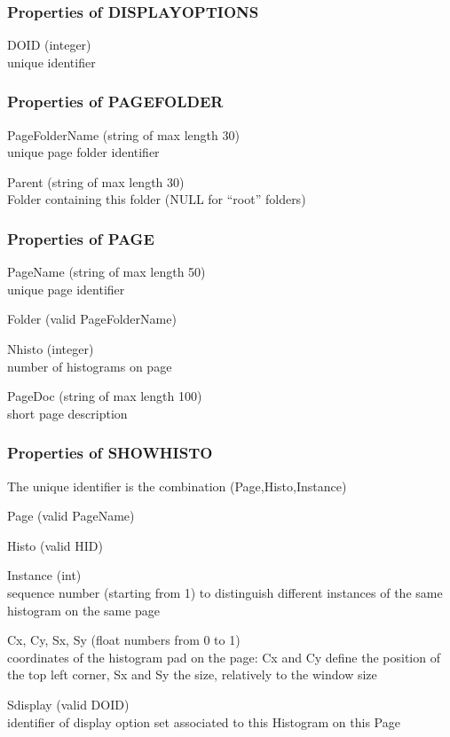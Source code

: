 \documentclass{lhcbnote}
\begin{document}
\subsubsection{Properties of DISPLAYOPTIONS}\label{dispopts}
\begin{description}
\item{DOID} (integer)\\
unique identifier 


\end{description}
\subsubsection{Properties of PAGEFOLDER}
\begin{description}
\item{PageFolderName} (string of max length 30)\\
unique page folder identifier
\item{Parent} (string of max length 30)\\
Folder containing this folder (NULL for ``root'' folders)
\end{description}

\subsubsection{Properties of PAGE}
\begin{description}
\item{PageName} (string of max length 50) \\
unique page identifier
\item{Folder} (valid PageFolderName) 
\item{Nhisto} (integer) \\
number of histograms on page
\item{PageDoc} (string of max length 100)\\
short page description
\end{description}

\subsubsection{Properties of SHOWHISTO}
The unique identifier is the combination (Page,Histo,Instance)
\begin{description}
\item{Page} (valid PageName)
\item{Histo} (valid HID)
\item{Instance} (int)\\
sequence number (starting from 1) to distinguish different instances
of the same histogram on the same page
\item{Cx, Cy, Sx, Sy} (float numbers from 0 to 1)\\
coordinates of the histogram pad on the page: Cx and Cy define the
position of the top left corner, Sx and Sy the size, relatively to the
window size
\item{Sdisplay} (valid DOID)\\
identifier of display option set associated to this Histogram on this Page
\end{description}
\end{document}
